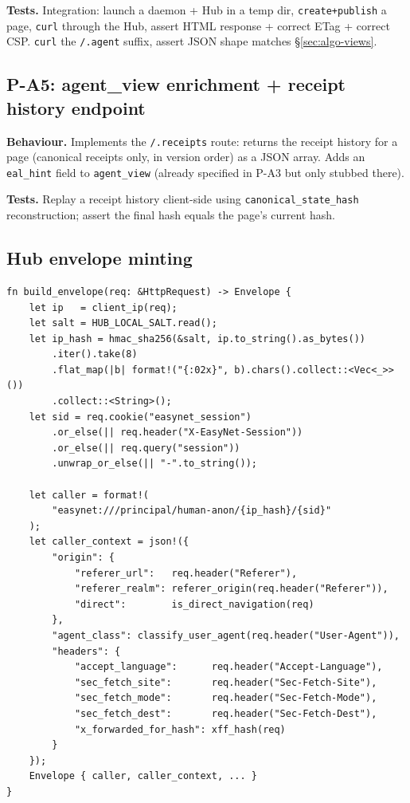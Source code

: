 \documentclass[11pt,a4paper]{article}
\theoremstyle{definition}
\begin{document}
\textbf{Tests.} Integration: launch a daemon + Hub in a temp dir,
\texttt{create+publish} a page, \texttt{curl} through the Hub,
assert HTML response + correct ETag + correct CSP. \texttt{curl}
the \texttt{/.agent} suffix, assert JSON shape matches
\S\ref{sec:algo-views}.

\subsection{P-A5: agent\_view enrichment + receipt history endpoint}

\textbf{Behaviour.} Implements the \texttt{/.receipts} route:
returns the receipt history for a page (canonical receipts only,
in version order) as a JSON array. Adds an
\texttt{eal\_hint} field to \texttt{agent\_view} (already
specified in P-A3 but only stubbed there).

\textbf{Tests.} Replay a receipt history client-side using
\texttt{canonical\_state\_hash} reconstruction; assert the final
hash equals the page's current hash.

\subsection{Hub envelope minting}
\label{sec:hub}

\begin{lstlisting}
fn build_envelope(req: &HttpRequest) -> Envelope {
    let ip   = client_ip(req);
    let salt = HUB_LOCAL_SALT.read();
    let ip_hash = hmac_sha256(&salt, ip.to_string().as_bytes())
        .iter().take(8)
        .flat_map(|b| format!("{:02x}", b).chars().collect::<Vec<_>>())
        .collect::<String>();
    let sid = req.cookie("easynet_session")
        .or_else(|| req.header("X-EasyNet-Session"))
        .or_else(|| req.query("session"))
        .unwrap_or_else(|| "-".to_string());

    let caller = format!(
        "easynet:///principal/human-anon/{ip_hash}/{sid}"
    );
    let caller_context = json!({
        "origin": {
            "referer_url":   req.header("Referer"),
            "referer_realm": referer_origin(req.header("Referer")),
            "direct":        is_direct_navigation(req)
        },
        "agent_class": classify_user_agent(req.header("User-Agent")),
        "headers": {
            "accept_language":      req.header("Accept-Language"),
            "sec_fetch_site":       req.header("Sec-Fetch-Site"),
            "sec_fetch_mode":       req.header("Sec-Fetch-Mode"),
            "sec_fetch_dest":       req.header("Sec-Fetch-Dest"),
            "x_forwarded_for_hash": xff_hash(req)
        }
    });
    Envelope { caller, caller_context, ... }
}
\end{lstlisting}
\end{document}

